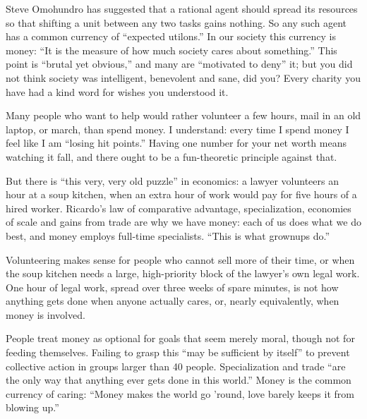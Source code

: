 
Steve Omohundro has suggested that a rational agent should spread its resources so that shifting a unit between any two tasks gains nothing. So any such agent has a common currency of ``expected utilons.'' In our society this currency is money: ``It is the measure of how much society cares about something.''  This point is ``brutal yet obvious,'' and many are ``motivated to deny'' it; but you did not think society was intelligent, benevolent and sane, did you? Every charity you have had a kind word for wishes you understood it.

Many people who want to help would rather volunteer a few hours, mail in an old laptop, or march, than spend money. I understand: every time I spend money I feel like I am ``losing hit points.'' Having one number for your net worth means watching it fall, and there ought to be a fun-theoretic principle against that. 

But there is ``this very, very old puzzle'' in economics: a lawyer volunteers an hour at a soup kitchen, when an extra hour of work would pay for five hours of a hired worker.  Ricardo's law of comparative advantage, specialization, economies of scale and gains from trade are why we have money: each of us does what we do best, and money employs full-time specialists. ``This is what grownups do.''

Volunteering makes sense for people who cannot sell more of their time, or when the soup kitchen needs a large, high-priority block of the lawyer's own legal work. One hour of legal work, spread over three weeks of spare minutes, is not how anything gets done when anyone actually cares, or, nearly equivalently, when money is involved.

People treat money as optional for goals that seem merely moral, though not for feeding themselves. Failing to grasp this ``may be sufficient by itself'' to prevent collective action in groups larger than 40 people. Specialization and trade ``are the only way that anything ever gets done in this world.'' Money is the common currency of caring: ``Money makes the world go 'round, love barely keeps it from blowing up.'' 

